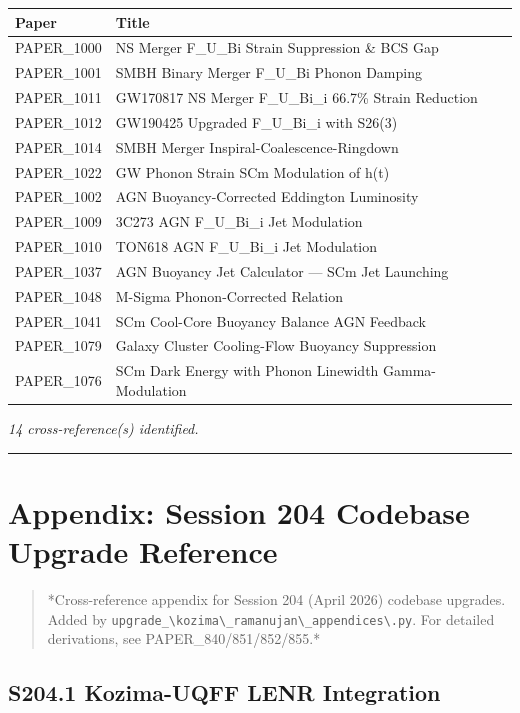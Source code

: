 \documentclass[12pt,a4paper]{article}
\begin{document}
\begin{table}[H]
\centering
\small
\begin{tabularx}{\linewidth}{@{}>{\raggedright\arraybackslash}X>{\raggedright\arraybackslash}X@{}}
\toprule
Paper & Title \tabularnewline
\midrule
PAPER\_1000 & NS Merger F\_{U\_Bi} Strain Suppression \& BCS Gap \tabularnewline
PAPER\_1001 & SMBH Binary Merger F\_{U\_Bi} Phonon Damping \tabularnewline
PAPER\_1011 & GW170817 NS Merger F\_{U\_Bi\_i} 66.7\% Strain Reduction \tabularnewline
PAPER\_1012 & GW190425 Upgraded F\_{U\_Bi\_i} with S26(3) \tabularnewline
PAPER\_1014 & SMBH Merger Inspiral-Coalescence-Ringdown \tabularnewline
PAPER\_1022 & GW Phonon Strain SCm Modulation of h(t) \tabularnewline
PAPER\_1002 & AGN Buoyancy-Corrected Eddington Luminosity \tabularnewline
PAPER\_1009 & 3C273 AGN F\_{U\_Bi\_i} Jet Modulation \tabularnewline
PAPER\_1010 & TON618 AGN F\_{U\_Bi\_i} Jet Modulation \tabularnewline
PAPER\_1037 & AGN Buoyancy Jet Calculator --- SCm Jet Launching \tabularnewline
PAPER\_1048 & M-Sigma Phonon-Corrected Relation \tabularnewline
PAPER\_1041 & SCm Cool-Core Buoyancy Balance AGN Feedback \tabularnewline
PAPER\_1079 & Galaxy Cluster Cooling-Flow Buoyancy Suppression \tabularnewline
PAPER\_1076 & SCm Dark Energy with Phonon Linewidth Gamma-Modulation \tabularnewline
\bottomrule
\end{tabularx}
\end{table}

\emph{14 cross-reference(s) identified.}

\medskip\hrule\medskip

\section{Appendix: Session 204 Codebase Upgrade Reference}

\begin{quote}
*Cross-reference appendix for Session 204 (April 2026) codebase upgrades.
Added by \texttt{upgrade\_\textbackslash {kozima\textbackslash \_ramanujan\textbackslash \_appendices\textbackslash }.py}. For detailed derivations,
see PAPER\_840/851/852/855.*
\end{quote}

\subsection{S204.1 Kozima-UQFF LENR Integration}
\end{document}
